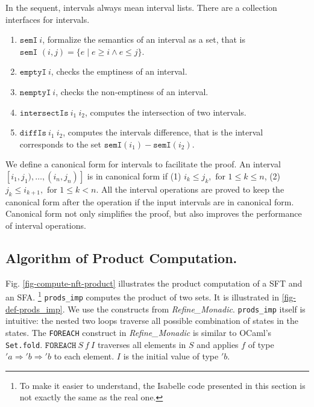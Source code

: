 \documentclass[a4paper,UKenglish,cleveref, autoref, thm-restate]{lipics-v2021}
\begin{document}
In the sequent, intervals always mean interval lists.
There are a collection interfaces for intervals. 
\begin{enumerate}
  \item $\texttt{semI}~i$, formalize the semantics of an interval as a set, that is $\texttt{semI }(i,j) = \{e \mid e \geq i \land e \leq j\}$.
  \item $\texttt{emptyI}~i$, checks the emptiness of an interval.
   \item $\texttt{nemptyI}~i$, checks the non-emptiness of an interval.
  \item $\texttt{intersectIs}~i_1~i_2$, computes the intersection of two intervals.
  \item $\texttt{diffIs}~i_1~i_2$, computes the intervals difference, that is the interval corresponds to the set $\texttt{semI}(i_1)-\texttt{semI}(i_2)$.
\end{enumerate}

We define a canonical form for intervals to facilitate the proof. An interval $[i_1, j_1), \ldots, (i_n, j_n)]$ is in canonical form if 
(1) $i_k \leq j_k, \text{ for } 1 \leq k \leq n$,
(2) $j_k\leq i_{k+1}, \text{ for } 1 \leq k < n$.
All the interval operations are proved to keep the canonical form after the operation if the input intervals are in canonical form.
Canonical form not only simplifies the proof, but also improves the performance of interval operations.




\subsection{Algorithm of Product Computation.}

Fig. \ref{fig-compute-nft-product} illustrates the product computation of a SFT and an SFA. \footnote{To make it easier to understand, the Isabelle code presented in this section is not exactly the same as the real one.}
\texttt{prods\_imp} computes the product of two sets. It is illustrated in \ref{fig-def-prods_imp}. We use the constructs from \emph{Refine\_Monadic}. \texttt{prods\_imp} itself is intuitive: the nested two loops traverse all possible combination of states in the states. 
The \texttt{FOREACH} construct in \emph{Refine\_Monadic} is similar to OCaml's \texttt{Set.fold}. $\texttt{FOREACH}~S~f~I$ traverses all elements in $S$ and applies $f$ of type $'a \Rightarrow 'b \Rightarrow 'b$ to each element. $I$ is the initial value of type $'b$.
\end{document}
